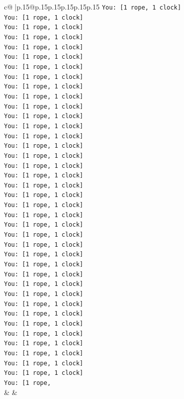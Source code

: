 \documentclass{article}
\begin{document}
{\begin{supertabular}{c@{$\;$}|p{.15\linewidth}@{}p{.15\linewidth}p{.15\linewidth}p{.15\linewidth}p{.15\linewidth}p{.15\linewidth}}
{{{\texttt{You: {[}1 rope, 1 clock{]}} \\
\texttt{You: {[}1 rope, 1 clock{]}} \\
\texttt{You: {[}1 rope, 1 clock{]}} \\
\texttt{You: {[}1 rope, 1 clock{]}} \\
\texttt{You: {[}1 rope, 1 clock{]}} \\
\texttt{You: {[}1 rope, 1 clock{]}} \\
\texttt{You: {[}1 rope, 1 clock{]}} \\
\texttt{You: {[}1 rope, 1 clock{]}} \\
\texttt{You: {[}1 rope, 1 clock{]}} \\
\texttt{You: {[}1 rope, 1 clock{]}} \\
\texttt{You: {[}1 rope, 1 clock{]}} \\
\texttt{You: {[}1 rope, 1 clock{]}} \\
\texttt{You: {[}1 rope, 1 clock{]}} \\
\texttt{You: {[}1 rope, 1 clock{]}} \\
\texttt{You: {[}1 rope, 1 clock{]}} \\
\texttt{You: {[}1 rope, 1 clock{]}} \\
\texttt{You: {[}1 rope, 1 clock{]}} \\
\texttt{You: {[}1 rope, 1 clock{]}} \\
\texttt{You: {[}1 rope, 1 clock{]}} \\
\texttt{You: {[}1 rope, 1 clock{]}} \\
\texttt{You: {[}1 rope, 1 clock{]}} \\
\texttt{You: {[}1 rope, 1 clock{]}} \\
\texttt{You: {[}1 rope, 1 clock{]}} \\
\texttt{You: {[}1 rope, 1 clock{]}} \\
\texttt{You: {[}1 rope, 1 clock{]}} \\
\texttt{You: {[}1 rope, 1 clock{]}} \\
\texttt{You: {[}1 rope, 1 clock{]}} \\
\texttt{You: {[}1 rope, 1 clock{]}} \\
\texttt{You: {[}1 rope, 1 clock{]}} \\
\texttt{You: {[}1 rope, 1 clock{]}} \\
\texttt{You: {[}1 rope, 1 clock{]}} \\
\texttt{You: {[}1 rope, 1 clock{]}} \\
\texttt{You: {[}1 rope, 1 clock{]}} \\
\texttt{You: {[}1 rope, 1 clock{]}} \\
\texttt{You: {[}1 rope, 1 clock{]}} \\
\texttt{You: {[}1 rope, 1 clock{]}} \\
\texttt{You: {[}1 rope, 1 clock{]}} \\
\texttt{You: {[}1 rope, 1 clock{]}} \\
\texttt{You: {[}1 rope,} \\
            }
        }
    }
    & & \\ \\


\end{supertabular}}
\end{document}

